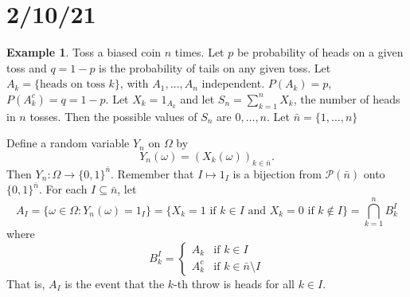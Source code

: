\documentclass{article}
\theoremstyle{definition}
\newtheorem*{example}{Example}
\begin{document}
\section*{2/10/21}

\begin{example}
Toss a biased coin $n$ times. Let $p$ be probability of heads on a given toss and $q = 1-p$ is the probability of tails on any given toss.
Let $A_k =\{\text{heads on toss } k\}$, with $A_1, \ldots, A_n$ independent. $P(A_k) = p$, $P(A_k^c) = q = 1-p$. Let $X_k = 1_{A_k}$ and let $S_n = \sum_{k=1}^n X_k$, the number of heads in $n$ tosses.
Then the possible values of $S_n$ are $0, \ldots, n$. Let $\bar{n} = \{1, \ldots, n\}$

Define a random variable $Y_n$ on $\Omega$ by
\[
    Y_n(\omega) = (X_k(\omega))_{k \in \bar{n}}.
\]
Then $Y_n: \Omega \longrightarrow \{0, 1\}^{\bar{n}}$. Remember that $I \mapsto 1_I$ is a bijection from $\mathcal{P}(\bar{n})$ onto $\{0,1\}^{\bar{n}}$.
For each $I \subseteq \bar{n}$, let
\[
    A_I = \{\omega \in \Omega : Y_n(\omega) = 1_I\} = \{X_k = 1 \text{ if } k \in I \text{ and } X_k = 0 \text{ if } k \notin I\} = \bigcap_{k=1}^n B^I_k
\]
where
\[
    B^I_k = \begin{cases}
        A_k &\text{if } k \in I \\
        A_k^c &\text{if } k \in \bar{n} \setminus I
    \end{cases}
\]
That is, $A_I$ is the event that the $k$-th throw is heads for all $k \in I$.


\end{example}
\end{document}
